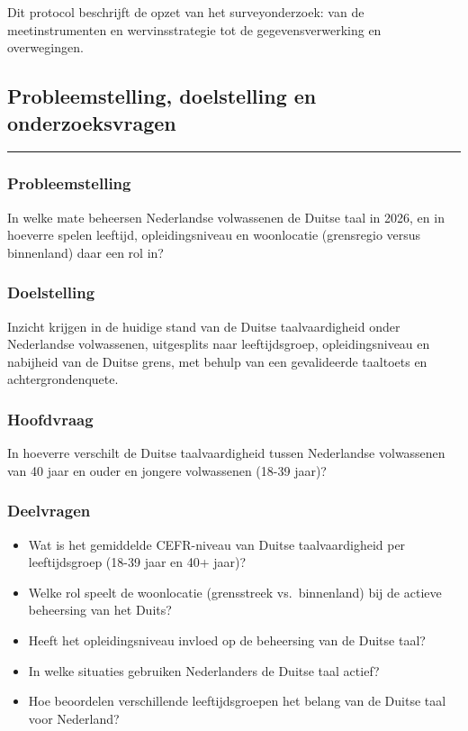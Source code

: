 \documentclass[
]{article}
\providecommand{\tightlist}{%
  \setlength{\itemsep}{0pt}\setlength{\parskip}{0pt}}
\begin{document}
Dit protocol beschrijft de opzet van het surveyonderzoek: van de
meetinstrumenten en wervinsstrategie tot de gegevensverwerking en
overwegingen.

\subsection{Probleemstelling, doelstelling en
onderzoeksvragen}\label{probleemstelling-doelstelling-en-onderzoeksvragen}

\begin{center}\rule{0.5\linewidth}{0.5pt}\end{center}

\subsubsection{Probleemstelling}\label{probleemstelling}

In welke mate beheersen Nederlandse volwassenen de Duitse taal in 2026,
en in hoeverre spelen leeftijd, opleidingsniveau en woonlocatie
(grensregio versus binnenland) daar een rol in?

\subsubsection{Doelstelling}\label{doelstelling}

Inzicht krijgen in de huidige stand van de Duitse taalvaardigheid onder
Nederlandse volwassenen, uitgesplits naar leeftijdsgroep,
opleidingsniveau en nabijheid van de Duitse grens, met behulp van een
gevalideerde taaltoets en achtergrondenquete.

\subsubsection{Hoofdvraag}\label{hoofdvraag}

In hoeverre verschilt de Duitse taalvaardigheid tussen Nederlandse
volwassenen van 40 jaar en ouder en jongere volwassenen (18-39 jaar)?

\subsubsection{Deelvragen}\label{deelvragen}

\begin{itemize}
\tightlist
\item
  Wat is het gemiddelde CEFR-niveau van Duitse taalvaardigheid per
  leeftijdsgroep (18-39 jaar en 40+ jaar)?
\item
  Welke rol speelt de woonlocatie (grensstreek vs.~binnenland) bij de
  actieve beheersing van het Duits?
\item
  Heeft het opleidingsniveau invloed op de beheersing van de Duitse
  taal?
\item
  In welke situaties gebruiken Nederlanders de Duitse taal actief?
\item
  Hoe beoordelen verschillende leeftijdsgroepen het belang van de Duitse
  taal voor Nederland?
\end{itemize}
\end{document}
